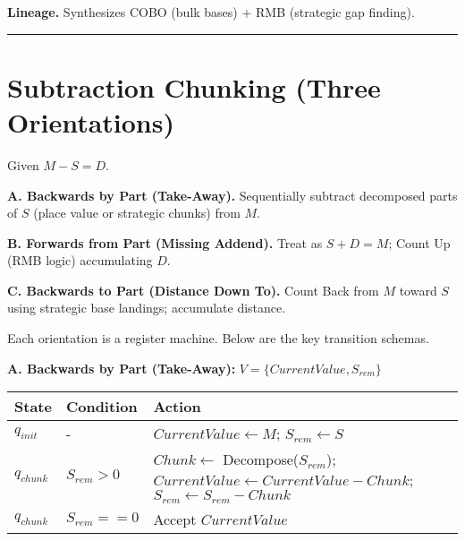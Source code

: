 \documentclass[
]{article}
\begin{document}
\textbf{Lineage.} Synthesizes COBO (bulk bases) + RMB (strategic gap
finding).

\begin{center}\rule{0.5\linewidth}{0.5pt}\end{center}

\section{Subtraction Chunking (Three
Orientations)}\label{subtraction-chunking-three-orientations}

Given \(M - S = D\).

\textbf{A. Backwards by Part (Take-Away).} Sequentially subtract
decomposed parts of \(S\) (place value or strategic chunks) from \(M\).

\textbf{B. Forwards from Part (Missing Addend).} Treat as \(S + D = M\);
Count Up (RMB logic) accumulating \(D\).

\textbf{C. Backwards to Part (Distance Down To).} Count Back from \(M\)
toward \(S\) using strategic base landings; accumulate distance.

Each orientation is a register machine. Below are the key transition
schemas.

\textbf{A. Backwards by Part (Take-Away):}
\(V = \{CurrentValue, S_{rem}\}\)

\begin{longtable}[]{@{}
  >{\raggedright\arraybackslash}p{}
  >{\raggedright\arraybackslash}p{}
  >{\raggedright\arraybackslash}p{}@{}}
\toprule\noalign{}
\begin{minipage}[b]{\linewidth}\raggedright
State
\end{minipage} & \begin{minipage}[b]{\linewidth}\raggedright
Condition
\end{minipage} & \begin{minipage}[b]{\linewidth}\raggedright
Action
\end{minipage} \\
\midrule\noalign{}
\endhead
\bottomrule\noalign{}
\endlastfoot
\(q_{init}\) & - & \(CurrentValue \leftarrow M\);
\(S_{rem} \leftarrow S\) \\
\(q_{chunk}\) & \(S_{rem} > 0\) & \(Chunk \leftarrow\)
Decompose(\(S_{rem}\));
\(CurrentValue \leftarrow CurrentValue - Chunk\);
\(S_{rem} \leftarrow S_{rem} - Chunk\) \\
\(q_{chunk}\) & \(S_{rem} == 0\) & Accept \(CurrentValue\) \\
\end{longtable}
\end{document}
